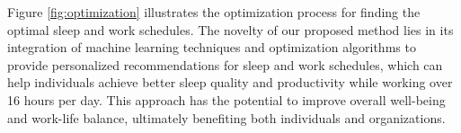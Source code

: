 Figure \ref{fig:optimization} illustrates the optimization process for finding the optimal sleep and work schedules. The novelty of our proposed method lies in its integration of machine learning techniques and optimization algorithms to provide personalized recommendations for sleep and work schedules, which can help individuals achieve better sleep quality and productivity while working over 16 hours per day. This approach has the potential to improve overall well-being and work-life balance, ultimately benefiting both individuals and organizations.